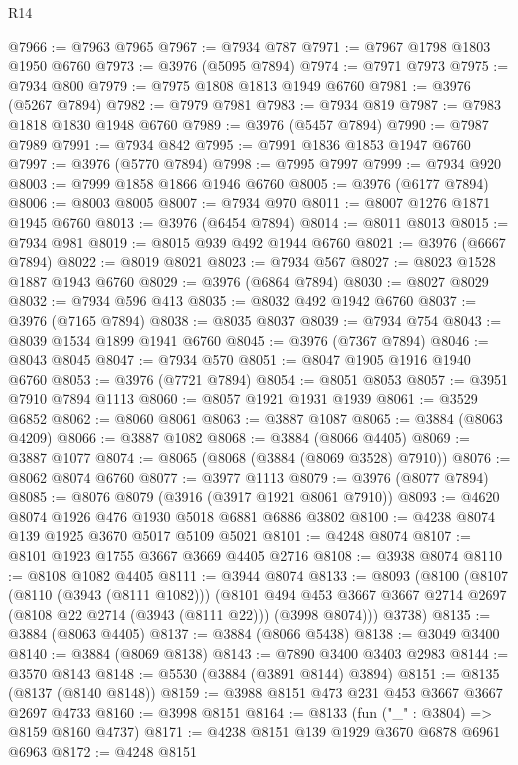 \begin{lexlean}{R14}
\begin{coremodule}
@7966 := @7963 @7965
@7967 := @7934 @787
@7971 := @7967 @1798 @1803 @1950 @6760
@7973 := @3976 (@5095 @7894)
@7974 := @7971 @7973
@7975 := @7934 @800
@7979 := @7975 @1808 @1813 @1949 @6760
@7981 := @3976 (@5267 @7894)
@7982 := @7979 @7981
@7983 := @7934 @819
@7987 := @7983 @1818 @1830 @1948 @6760
@7989 := @3976 (@5457 @7894)
@7990 := @7987 @7989
@7991 := @7934 @842
@7995 := @7991 @1836 @1853 @1947 @6760
@7997 := @3976 (@5770 @7894)
@7998 := @7995 @7997
@7999 := @7934 @920
@8003 := @7999 @1858 @1866 @1946 @6760
@8005 := @3976 (@6177 @7894)
@8006 := @8003 @8005
@8007 := @7934 @970
@8011 := @8007 @1276 @1871 @1945 @6760
@8013 := @3976 (@6454 @7894)
@8014 := @8011 @8013
@8015 := @7934 @981
@8019 := @8015 @939 @492 @1944 @6760
@8021 := @3976 (@6667 @7894)
@8022 := @8019 @8021
@8023 := @7934 @567
@8027 := @8023 @1528 @1887 @1943 @6760
@8029 := @3976 (@6864 @7894)
@8030 := @8027 @8029
@8032 := @7934 @596 @413
@8035 := @8032 @492 @1942 @6760
@8037 := @3976 (@7165 @7894)
@8038 := @8035 @8037
@8039 := @7934 @754
@8043 := @8039 @1534 @1899 @1941 @6760
@8045 := @3976 (@7367 @7894)
@8046 := @8043 @8045
@8047 := @7934 @570
@8051 := @8047 @1905 @1916 @1940 @6760
@8053 := @3976 (@7721 @7894)
@8054 := @8051 @8053
@8057 := @3951 @7910 @7894 @1113
@8060 := @8057 @1921 @1931 @1939
@8061 := @3529 @6852
@8062 := @8060 @8061
@8063 := @3887 @1087
@8065 := @3884 (@8063 @4209)
@8066 := @3887 @1082
@8068 := @3884 (@8066 @4405)
@8069 := @3887 @1077
@8074 := @8065 (@8068 (@3884 (@8069 @3528) @7910))
@8076 := @8062 @8074 @6760
@8077 := @3977 @1113
@8079 := @3976 (@8077 @7894)
@8085 := @8076 @8079 (@3916 (@3917 @1921 @8061 @7910))
@8093 := @4620 @8074 @1926 @476 @1930 @5018 @6881 @6886 @3802
@8100 := @4238 @8074 @139 @1925 @3670 @5017 @5109 @5021
@8101 := @4248 @8074
@8107 := @8101 @1923 @1755 @3667 @3669 @4405 @2716
@8108 := @3938 @8074
@8110 := @8108 @1082 @4405
@8111 := @3944 @8074
@8133 := @8093
    (@8100
      (@8107
        (@8110 (@3943 (@8111 @1082)))
        (@8101
          @494
          @453
          @3667
          @3667
          @2714
          @2697
          (@8108 @22 @2714 (@3943 (@8111 @22)))
          (@3998 @8074)))
      @3738)
@8135 := @3884 (@8063 @4405)
@8137 := @3884 (@8066 @5438)
@8138 := @3049 @3400
@8140 := @3884 (@8069 @8138)
@8143 := @7890 @3400 @3403 @2983
@8144 := @3570 @8143
@8148 := @5530 (@3884 (@3891 @8144) @3894)
@8151 := @8135 (@8137 (@8140 @8148))
@8159 := @3988 @8151 @473 @231 @453 @3667 @3667 @2697 @4733
@8160 := @3998 @8151
@8164 := @8133 (fun ("_" : @3804) => @8159 @8160 @4737)
@8171 := @4238 @8151 @139 @1929 @3670 @6878 @6961 @6963
@8172 := @4248 @8151

\end{coremodule}
\end{lexlean}
